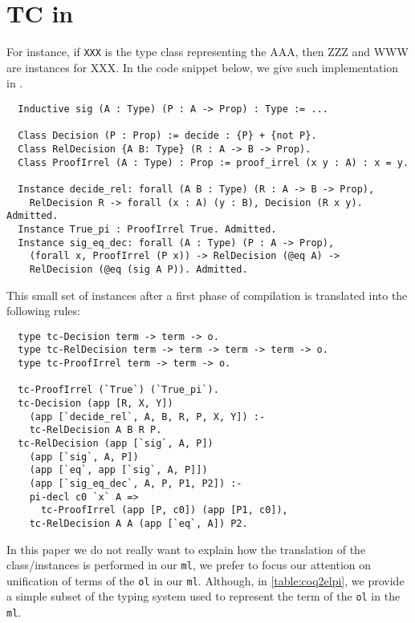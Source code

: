 \documentclass[acmengage]{acmart}
\def\elpi{\proglang{elpi}}
\def\coq{\proglang{coq}}
\newcommand*{\acronym}[1]{\texttt{#1}\xspace}
\def\ol{\acronym{ol}} %
\def\ml{\acronym{ml}} %
\begin{document}
\section{TC in \coq}
For instance, if
\texttt{XXX} is the type class representing the AAA, then ZZZ and WWW are
instances for XXX. In the code snippet below, we give such implementation in
\coq. 

\begin{verbatim}
  Inductive sig (A : Type) (P : A -> Prop) : Type := ...

  Class Decision (P : Prop) := decide : {P} + {not P}.
  Class RelDecision {A B: Type} (R : A -> B -> Prop).
  Class ProofIrrel (A : Type) : Prop := proof_irrel (x y : A) : x = y.

  Instance decide_rel: forall (A B : Type) (R : A -> B -> Prop),
    RelDecision R -> forall (x : A) (y : B), Decision (R x y). Admitted.
  Instance True_pi : ProofIrrel True. Admitted.
  Instance sig_eq_dec: forall (A : Type) (P : A -> Prop),
    (forall x, ProofIrrel (P x)) -> RelDecision (@eq A) ->
    RelDecision (@eq (sig A P)). Admitted.
\end{verbatim}

This small set of instances after a first phase of compilation is translated into the following \elpi rules:

\begin{verbatim}
  type tc-Decision term -> term -> o.
  type tc-RelDecision term -> term -> term -> term -> o.
  type tc-ProofIrrel term -> term -> o.

  tc-ProofIrrel (`True`) (`True_pi`).
  tc-Decision (app [R, X, Y]) 
    (app [`decide_rel`, A, B, R, P, X, Y]) :-
    tc-RelDecision A B R P.
  tc-RelDecision (app [`sig`, A, P]) 
    (app [`sig`, A, P]) 
    (app [`eq`, app [`sig`, A, P]]) 
    (app [`sig_eq_dec`, A, P, P1, P2]) :-
    pi-decl c0 `x` A =>
      tc-ProofIrrel (app [P, c0]) (app [P1, c0]), 
    tc-RelDecision A A (app [`eq`, A]) P2.
\end{verbatim}

In this paper we do not really want to explain how the translation of the
class/instances is performed in our \ml, we prefer to focus our attention on
unification of terms of the \ol in our \ml. Although, in \cref{table:coq2elpi},
we provide a simple subset of the typing system used to represent the term of
the \ol in the \ml.
\end{document}
